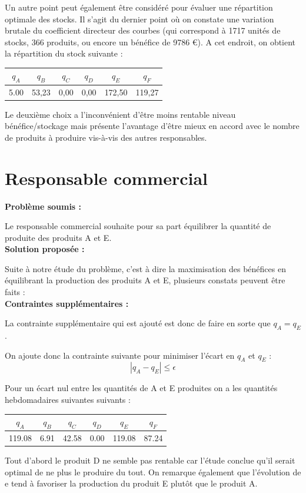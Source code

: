 \documentclass[paper=a4, fontsize=11pt]{report}
\numberwithin{equation}{section}		%
\numberwithin{figure}{section}			%
\numberwithin{table}{section}				%
\renewcommand{\bf}[1]{\textbf{#1}}
\newcommand\abs[1]{\left|#1\right|}
\begin{document}
Un autre point peut également être considéré pour évaluer une répartition optimale des stocks. Il s'agit du dernier point où on constate une variation brutale du coefficient directeur des courbes (qui correspond à 1717 unités de stocks, 366 produits, ou encore un bénéfice de 9786 €). A cet endroit, on obtient la répartition du stock suivante :

\begin{center}
\begin{tabular}{cccccc}
\hline 
$q_A$ & $q_B$ & $q_C$ & $q_D$ & $q_E$ & $q_F$ \\ 
\hline 
5.00 & 53,23 & 0,00 & 0,00 & 172,50 & 119,27 \\ 
\hline 
\end{tabular} 
\end{center}

Le deuxième choix a l'inconvénient d'être moins rentable niveau bénéfice/stockage mais présente l'avantage d'être mieux en accord avec le nombre de produits à produire vis-à-vis des autres responsables.

\section{Responsable commercial}
\bf{Problème soumis :}

Le responsable commercial souhaite pour sa part équilibrer la quantité de produite des produits A et E.\\

\bf{Solution proposée :}

Suite à notre étude du problème, c'est à dire la maximisation des bénéfices en équilibrant la production des produits A et E, plusieurs constats peuvent être faits :\\

\bf{Contraintes supplémentaires :}

La contrainte supplémentaire qui est ajouté est donc de faire en sorte que $q_A = q_E$. 

On ajoute donc la contrainte suivante pour minimiser l'écart en $q_A$ et $q_E$ : \[ \abs{q_A - q_E} \leq \epsilon \] 

Pour un écart nul entre les quantités de A et E produites on a les quantités hebdomadaires suivantes suivants :
\begin{center}
\begin{tabular}{cccccc}
\hline
$q_A$ & $q_B$ & $q_C$ & $q_D$ & $q_E$ & $q_F$ \\
\hline
119.08 & 6.91 & 42.58 & 0.00 & 119.08 & 87.24 \\
\hline
\end{tabular}
\end{center}
Tout d'abord le produit D ne semble pas rentable car l'étude conclue qu'il serait optimal de ne plus le produire du tout.
On remarque également que l’évolution de e tend à favoriser la production du produit E plutôt que le produit A.
\end{document}
